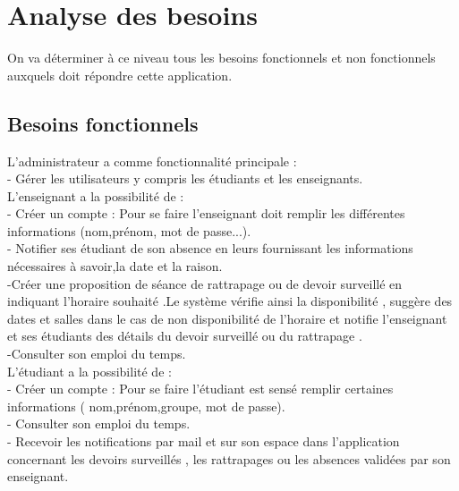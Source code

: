 \documentclass[a4paper,12pt,oneside]{report}
\begin{document}
  \section{Analyse des besoins}
  On va déterminer à ce niveau tous les besoins fonctionnels et non fonctionnels auxquels  doit répondre cette application.
  \subsection{Besoins fonctionnels} 
\begin{flushleft}L'administrateur a comme fonctionnalité  principale :\\
 - Gérer les utilisateurs y compris les étudiants et les enseignants.\\ 

L'enseignant a la possibilité de : \\
- Créer un compte : Pour se faire l'enseignant doit remplir les différentes  informations (nom,prénom, mot de passe...). \\
- Notifier ses étudiant de son absence en leurs fournissant les informations nécessaires à savoir,la date et la raison. \\
-Créer une proposition de séance de rattrapage ou de devoir surveillé  en indiquant l'horaire souhaité .Le système vérifie ainsi la disponibilité , suggère des dates et salles dans le cas de non disponibilité de l'horaire et notifie l'enseignant et ses étudiants des détails du devoir surveillé ou du rattrapage . \\
-Consulter son emploi du temps.\\ 
 L'étudiant a la possibilité de : \\
- Créer un compte : Pour se faire l'étudiant est sensé remplir certaines informations (	nom,prénom,groupe, mot de passe). \\
- Consulter son emploi du temps.  \\
- Recevoir les notifications par mail et sur son espace dans l'application concernant les devoirs surveillés , les rattrapages ou les absences validées par son enseignant.\end{flushleft} 
\end{document}
